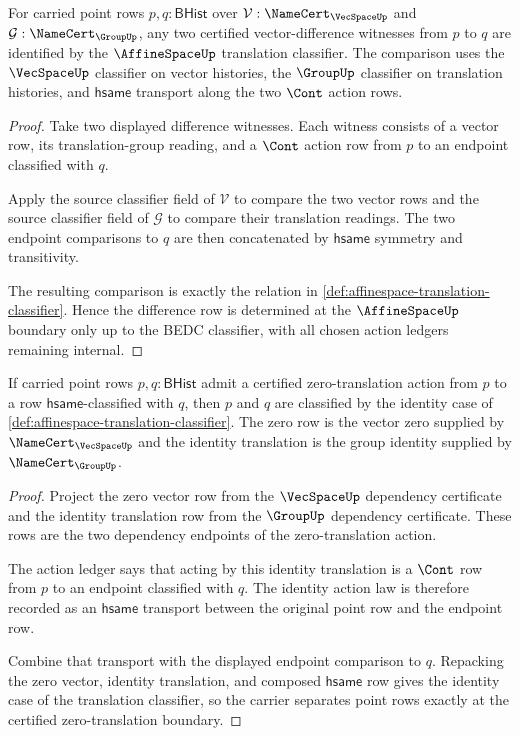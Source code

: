 \begin{theorem}
\label{thm:affinespace-vector-difference-obligation}
For carried point rows $p,q:\mathsf{BHist}$ over $\mathcal{V}:\NameCert_{\VecSpaceUp}$ and $\mathcal{G}:\NameCert_{\GroupUp}$, any two certified vector-difference witnesses from $p$ to $q$ are identified by the $\AffineSpaceUp$ translation classifier. The comparison uses the $\VecSpaceUp$ classifier on vector histories, the $\GroupUp$ classifier on translation histories, and $\mathsf{hsame}$ transport along the two $\Cont$ action rows.
\end{theorem}
\begin{proof}
Take two displayed difference witnesses. Each witness consists of a vector row, its translation-group reading, and a $\Cont$ action row from $p$ to an endpoint classified with $q$.

Apply the source classifier field of $\mathcal{V}$ to compare the two vector rows and the source classifier field of $\mathcal{G}$ to compare their translation readings. The two endpoint comparisons to $q$ are then concatenated by $\mathsf{hsame}$ symmetry and transitivity.

The resulting comparison is exactly the relation in \autoref{def:affinespace-translation-classifier}. Hence the difference row is determined at the $\AffineSpaceUp$ boundary only up to the BEDC classifier, with all chosen action ledgers remaining internal.
\end{proof}

\begin{theorem}
\label{thm:affinespace-separation-obligation}
If carried point rows $p,q:\mathsf{BHist}$ admit a certified zero-translation action from $p$ to a row $\mathsf{hsame}$-classified with $q$, then $p$ and $q$ are classified by the identity case of \autoref{def:affinespace-translation-classifier}. The zero row is the vector zero supplied by $\NameCert_{\VecSpaceUp}$ and the identity translation is the group identity supplied by $\NameCert_{\GroupUp}$.
\end{theorem}
\begin{proof}
Project the zero vector row from the $\VecSpaceUp$ dependency certificate and the identity translation row from the $\GroupUp$ dependency certificate. These rows are the two dependency endpoints of the zero-translation action.

The action ledger says that acting by this identity translation is a $\Cont$ row from $p$ to an endpoint classified with $q$. The identity action law is therefore recorded as an $\mathsf{hsame}$ transport between the original point row and the endpoint row.

Combine that transport with the displayed endpoint comparison to $q$. Repacking the zero vector, identity translation, and composed $\mathsf{hsame}$ row gives the identity case of the translation classifier, so the carrier separates point rows exactly at the certified zero-translation boundary.
\end{proof}

